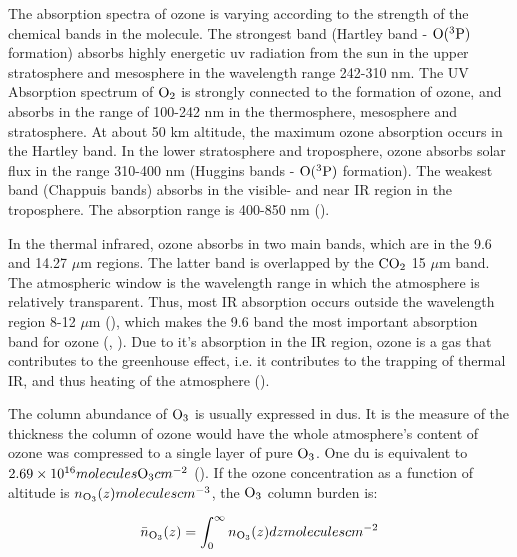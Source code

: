 \medskip

The absorption spectra of ozone is varying according to the strength of the chemical bands in the molecule. The strongest band (Hartley band - $\mathrm{O(^3P)}$ formation) absorbs highly energetic \acrfull{uv} radiation from the sun in the upper stratosphere and mesosphere in the wavelength range 242-310 nm. The UV Absorption spectrum of $\mathrm{O_2}$ is strongly connected to the formation of ozone, and absorbs in the range of 100-242 nm in the thermosphere, mesosphere and stratosphere. At about 50 km altitude, the maximum ozone absorption occurs in the Hartley band. In the lower stratosphere and troposphere, ozone absorbs solar flux in the range 310-400 nm (Huggins bands - $\mathrm{O(^3P)}$ formation). The weakest band (Chappuis bands) absorbs in the visible- and near IR region in the troposphere. The absorption range is 400-850 nm (\cite{Liou_AtmRad}). 



\medskip 

In the thermal infrared, ozone absorbs in two main bands, which are in the 9.6 and 14.27 $\mu$m regions. The latter band is overlapped by the $\mathrm{CO_2}$ 15 $\mu$m band. The atmospheric window is the wavelength range in which the atmosphere is relatively transparent. Thus, most IR absorption occurs outside the wavelength region 8-12 $\mu$m (\cite{AtmModFund}), which makes the 9.6 band the most important absorption band for ozone (\cite{Liou_AtmRad}, \cite{Myhre1997}). Due to it's absorption in the IR region, ozone is a gas that contributes to the greenhouse effect, i.e. it contributes to the trapping of thermal IR, and thus heating of the atmosphere (\cite{Liou_AtmRad}).

\medskip

The column abundance of $\mathrm{O_3}$ is usually expressed in \acrlong{du}s. It is the measure of the thickness the column of ozone would have the whole atmosphere's content of ozone was compressed to a single layer of pure $\mathrm{O_3}$. One \acrshort{du} is equivalent to $2.69\times10^{16} molecules \mathrm{O_3} cm^{-2}$ (\cite{SeinfeldSpyros}). If the ozone concentration as a function of altitude is $n_{\mathrm{O_3}}(z) molecules cm^{-3}$, the $\mathrm{O_3}$ column burden is: 

\begin{equation}
    \bar{n}_{\mathrm{O_3}}(z) = \int_0^\infty n_{\mathrm{O_3}}(z)dz molecules cm^{-2}
    \label{eqn:o3_column_burden}
\end{equation}


